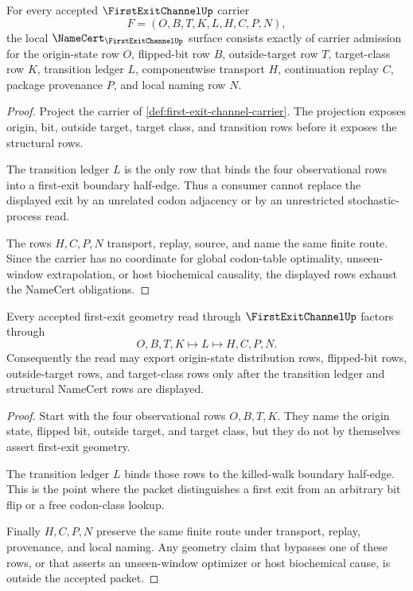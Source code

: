 \begin{theorem}
\label{thm:first-exit-channel-namecert-obligations}
For every accepted $\FirstExitChannelUp$ carrier
$$
F=(O,B,T,K,L,H,C,P,N),
$$
the local $\NameCert_{\FirstExitChannelUp}$ surface consists exactly of carrier admission for the origin-state row $O$, flipped-bit row $B$, outside-target row $T$, target-class row $K$, transition ledger $L$, componentwise transport $H$, continuation replay $C$, package provenance $P$, and local naming row $N$.
\end{theorem}
\begin{proof}
Project the carrier of \autoref{def:first-exit-channel-carrier}. The projection exposes origin, bit, outside target, target class, and transition rows before it exposes the structural rows.

The transition ledger $L$ is the only row that binds the four observational rows into a first-exit boundary half-edge. Thus a consumer cannot replace the displayed exit by an unrelated codon adjacency or by an unrestricted stochastic-process read.

The rows $H,C,P,N$ transport, replay, source, and name the same finite route. Since the carrier has no coordinate for global codon-table optimality, unseen-window extrapolation, or host biochemical causality, the displayed rows exhaust the NameCert obligations.
\end{proof}

\begin{theorem}
\label{thm:first-exit-channel-geometry-readback}
Every accepted first-exit geometry read through $\FirstExitChannelUp$ factors through
$$
O,B,T,K\longmapsto L\longmapsto H,C,P,N .
$$
Consequently the read may export origin-state distribution rows, flipped-bit rows, outside-target rows, and target-class rows only after the transition ledger and structural NameCert rows are displayed.
\end{theorem}
\begin{proof}
Start with the four observational rows $O,B,T,K$. They name the origin state, flipped bit, outside target, and target class, but they do not by themselves assert first-exit geometry.

The transition ledger $L$ binds those rows to the killed-walk boundary half-edge. This is the point where the packet distinguishes a first exit from an arbitrary bit flip or a free codon-class lookup.

Finally $H,C,P,N$ preserve the same finite route under transport, replay, provenance, and local naming. Any geometry claim that bypasses one of these rows, or that asserts an unseen-window optimizer or host biochemical cause, is outside the accepted packet.
\end{proof}


